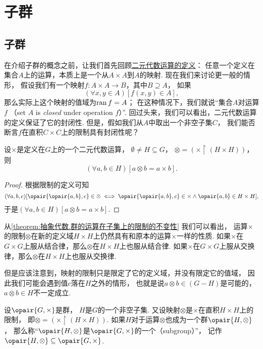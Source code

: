 \section{子群}
\subsection{子群}
在介绍子群的概念之前，让我们首先回顾\hyperref[definition:集合论.二元代数运算]{二元代数运算的定义}：
任意一个定义在集合\(A\)上的运算，本质上是一个从\(A \times A\)到\(A\)的映射.
现在我们来讨论更一般的情形，
假设我们有一个映射\(f\colon A \times A \to B\)，其中\(B \supseteq A\)，
如果\[
	(\forall x,y \in A)[f(x,y) \in A],
\]
那么实际上这个映射的值域为\(\operatorname{ran} f = A\)；
在这种情况下，我们就说“集合\(A\)对运算\(f\) %
（set \(A\) is \emph{closed} under operation \(f\)）”.
回过头来，我们可以看出，二元代数运算的定义保证了它的封闭性.
但是，假如我们从\(A\)中取出一个非空子集\(C\)，
我们能否断言\(f\)在直积\(C \times C\)上的限制具有封闭性呢？

\begin{lemma}\label{theorem:抽象代数.群的运算在子集上的限制的不变性}
设\(\times\)是定义在\(G\)上的一个二元代数运算，
\(\emptyset \neq H \subseteq G\)，
\(\otimes = (\times \upharpoonright(H \times H))\)，
则\[
	(\forall a,b \in H)[a \otimes b = a \times b].
\]
\begin{proof}
根据限制的定义可知\[
	(\forall a,b,c)[
		\opair{\opair{a,b},c} \in \otimes
		\iff
		\opair{\opair{a,b},c} \in \times
		\land
		\opair{a,b} \in H \times H
	],
\]
于是\((\forall a,b \in H)[a \otimes b = a \times b]\).
\end{proof}
\end{lemma}
从\cref{theorem:抽象代数.群的运算在子集上的限制的不变性} 我们可以看出，
运算\(\times\)的限制\(\otimes\)在新的定义域\(H \times H\)上仍然具有和原本的运算\(\times\)一样的性质.
如果\(\times\)在\(G \times G\)上服从结合律，那么\(\otimes\)在\(H \times H\)上也服从结合律.
如果\(\times\)在\(G \times G\)上服从交换律，那么\(\otimes\)在\(H \times H\)上也服从交换律.

但是应该注意到，映射的限制只是限定了它的定义域，并没有限定它的值域，
因此我们可能会遇到值\(c\)落在\(H\)之外的情形，
也就是说\(a \otimes b \in(G - H)\)是可能的，
\(a \otimes b \in H\)不一定成立.

\begin{definition}\label{definition:抽象代数.子群的定义}
设\(\opair{G,\times}\)是群，
\(H\)是\(G\)的一个非空子集.
又设映射\(\otimes\)是\(\times\)在直积\(H \times H\)上的限制，
即\(\otimes = (\times \upharpoonright(H \times H))\).
如果\(H\)对于运算\(\otimes\)也成为一个群\(\opair{H,\otimes}\)，
那么称“\(\opair{H,\otimes}\)是\(\opair{G,\times}\)的一个（subgroup）”，
记作\(\opair{H,\otimes} \subseteq \opair{G,\times}\).
\end{definition}

